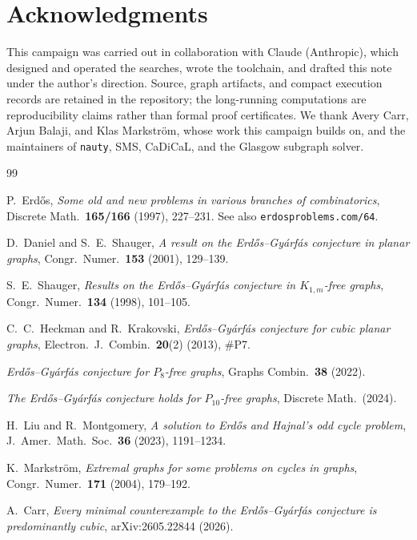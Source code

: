 \documentclass[11pt]{article}
\theoremstyle{remark}
\newcommand{\EG}{Erd\H{o}s--Gy\'arf\'as}
\begin{document}
\section*{Acknowledgments}

This campaign was carried out in collaboration with Claude (Anthropic),
which designed and operated the searches, wrote the toolchain, and drafted
this note under the author's direction. Source, graph artifacts, and compact
execution records are retained in the repository; the long-running
computations are reproducibility claims rather than formal proof
certificates. We thank Avery Carr, Arjun Balaji, and Klas
Markstr\"om, whose work this campaign builds on, and the maintainers of
\texttt{nauty}, SMS, CaDiCaL, and the Glasgow subgraph solver.

\begin{thebibliography}{99}

 P.~Erd\H{o}s,
\emph{Some old and new problems in various branches of combinatorics},
Discrete Math.\ \textbf{165/166} (1997), 227--231. See also
\texttt{erdosproblems.com/64}.

 D.~Daniel and S.~E.~Shauger,
\emph{A result on the \EG{} conjecture in planar graphs},
Congr.\ Numer.\ \textbf{153} (2001), 129--139.

 S.~E.~Shauger,
\emph{Results on the \EG{} conjecture in $K_{1,m}$-free graphs},
Congr.\ Numer.\ \textbf{134} (1998), 101--105.

 C.~C.~Heckman and R.~Krakovski,
\emph{\EG{} conjecture for cubic planar graphs},
Electron.\ J.\ Combin.\ \textbf{20}(2) (2013), \#P7.

 \emph{\EG{} conjecture for $P_8$-free graphs},
Graphs Combin.\ \textbf{38} (2022). %

 \emph{The \EG{} conjecture holds for $P_{10}$-free
graphs}, Discrete Math.\ (2024). %

 H.~Liu and R.~Montgomery,
\emph{A solution to Erd\H{o}s and Hajnal's odd cycle problem},
J.\ Amer.\ Math.\ Soc.\ \textbf{36} (2023), 1191--1234.

 K.~Markstr\"om,
\emph{Extremal graphs for some problems on cycles in graphs},
Congr.\ Numer.\ \textbf{171} (2004), 179--192.

 A.~Carr,
\emph{Every minimal counterexample to the \EG{} conjecture is predominantly
cubic}, arXiv:2605.22844 (2026).


\end{thebibliography}
\end{document}
